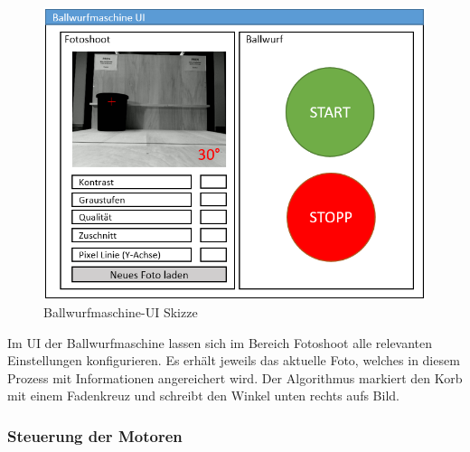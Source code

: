 \begin{figure}[h!]
	\centering
	\includegraphics[scale=0.75]{../../fig/fotoshoot-configurator.png}
	\caption{Ballwurfmaschine-UI Skizze}
\end{figure}

Im UI der Ballwurfmaschine lassen sich im Bereich Fotoshoot alle relevanten Einstellungen konfigurieren. Es erhält jeweils das aktuelle Foto, welches in diesem Prozess mit Informationen angereichert wird. Der Algorithmus markiert den Korb mit einem Fadenkreuz und schreibt den Winkel unten rechts aufs Bild.

\subsubsection{Steuerung der Motoren}

